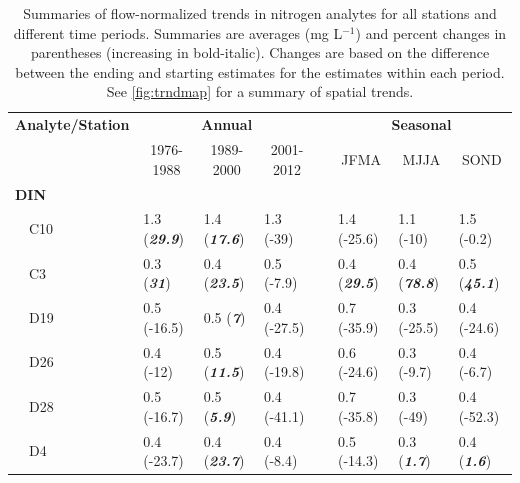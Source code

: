 \documentclass[letterpaper,12pt,oneside]{article}\usepackage[]{graphicx}\usepackage[]{color}
\begin{document}
\clearpage

\begin{table}[!tbp]
\caption{Summaries of flow-normalized trends in nitrogen analytes for all stations and different time periods.  Summaries are averages (mg L$^{-1}$) and percent changes in parentheses (increasing in bold-italic).  Changes are based on the difference between the ending and starting estimates for the estimates within each period.  See \cref{fig:trndmap} for a summary of spatial trends.\label{tab:trnds}} 
\begin{center}
\begin{tabular}{llllclll}
\hline\hline
\multicolumn{1}{l}{\bfseries Analyte/Station}&\multicolumn{3}{c}{\bfseries Annual}&\multicolumn{1}{c}{\bfseries }&\multicolumn{3}{c}{\bfseries Seasonal}\tabularnewline
\cline{2-4} \cline{6-8}
\multicolumn{1}{l}{}&\multicolumn{1}{c}{1976-1988}&\multicolumn{1}{c}{1989-2000}&\multicolumn{1}{c}{2001-2012}&\multicolumn{1}{c}{}&\multicolumn{1}{c}{JFMA}&\multicolumn{1}{c}{MJJA}&\multicolumn{1}{c}{SOND}\tabularnewline
\hline
{\bfseries DIN}&&&&&&&\tabularnewline
~~C10&1.3 \footnotesize{(\textit{\textbf{29.9}})}&1.4 \footnotesize{(\textit{\textbf{17.6}})}&1.3 \footnotesize{(-39)}&&1.4 \footnotesize{(-25.6)}&1.1 \footnotesize{(-10)}&1.5 \footnotesize{(-0.2)}\tabularnewline
~~C3&0.3 \footnotesize{(\textit{\textbf{31}})}&0.4 \footnotesize{(\textit{\textbf{23.5}})}&0.5 \footnotesize{(-7.9)}&&0.4 \footnotesize{(\textit{\textbf{29.5}})}&0.4 \footnotesize{(\textit{\textbf{78.8}})}&0.5 \footnotesize{(\textit{\textbf{45.1}})}\tabularnewline
~~D19&0.5 \footnotesize{(-16.5)}&0.5 \footnotesize{(\textit{\textbf{7}})}&0.4 \footnotesize{(-27.5)}&&0.7 \footnotesize{(-35.9)}&0.3 \footnotesize{(-25.5)}&0.4 \footnotesize{(-24.6)}\tabularnewline
~~D26&0.4 \footnotesize{(-12)}&0.5 \footnotesize{(\textit{\textbf{11.5}})}&0.4 \footnotesize{(-19.8)}&&0.6 \footnotesize{(-24.6)}&0.3 \footnotesize{(-9.7)}&0.4 \footnotesize{(-6.7)}\tabularnewline
~~D28&0.5 \footnotesize{(-16.7)}&0.5 \footnotesize{(\textit{\textbf{5.9}})}&0.4 \footnotesize{(-41.1)}&&0.7 \footnotesize{(-35.8)}&0.3 \footnotesize{(-49)}&0.4 \footnotesize{(-52.3)}\tabularnewline
~~D4&0.4 \footnotesize{(-23.7)}&0.4 \footnotesize{(\textit{\textbf{23.7}})}&0.4 \footnotesize{(-8.4)}&&0.5 \footnotesize{(-14.3)}&0.3 \footnotesize{(\textit{\textbf{1.7}})}&0.4 \footnotesize{(\textit{\textbf{1.6}})}\tabularnewline

\end{tabular}
\end{center}
\end{table}
\end{document}
